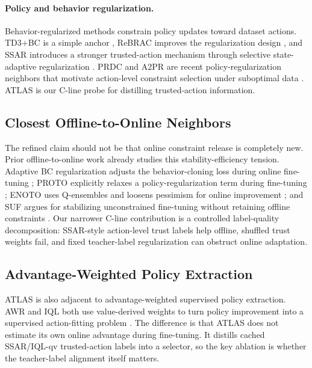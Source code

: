 
\paragraph{Policy and behavior regularization.}
Behavior-regularized methods constrain policy updates toward dataset actions. TD3+BC is a simple anchor \citep{fujimoto2021td3bc}, ReBRAC improves the regularization design \citep{tarasov2023rebrac}, and SSAR introduces a stronger trusted-action mechanism through selective state-adaptive regularization \citep{luo2025ssar}. PRDC and A2PR are recent policy-regularization neighbors that motivate action-level constraint selection under suboptimal data \citep{ran2023prdc,liu2024a2pr}. ATLAS is our C-line probe for distilling trusted-action information.

\subsection{Closest Offline-to-Online Neighbors}

The refined claim should not be that online constraint release is completely new. Prior offline-to-online work already studies this stability-efficiency tension. Adaptive BC regularization adjusts the behavior-cloning loss during online fine-tuning \citep{zhao2022adaptivebc}; PROTO explicitly relaxes a policy-regularization term during fine-tuning \citep{li2023proto}; ENOTO uses Q-ensembles and loosens pessimism for online improvement \citep{zhao2024enoto}; and SUF argues for stabilizing unconstrained fine-tuning without retaining offline constraints \citep{feng2024suf}. Our narrower C-line contribution is a controlled label-quality decomposition: SSAR-style action-level trust labels help offline, shuffled trust weights fail, and fixed teacher-label regularization can obstruct online adaptation.

\subsection{Advantage-Weighted Policy Extraction}

ATLAS is also adjacent to advantage-weighted supervised policy extraction. AWR and IQL both use value-derived weights to turn policy improvement into a supervised action-fitting problem \citep{peng2019awr,kostrikov2021iql}. The difference is that ATLAS does not estimate its own online advantage during fine-tuning. It distills cached SSAR/IQL-qv trusted-action labels into a selector, so the key ablation is whether the teacher-label alignment itself matters.

